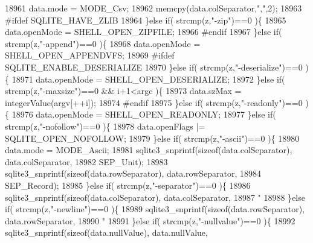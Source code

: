 \begin{DoxyCode}
{{{{18961       data.mode = MODE_Csv;
18962       memcpy(data.colSeparator,\textcolor{stringliteral}{","},2);
18963 \textcolor{preprocessor}{#ifdef SQLITE\_HAVE\_ZLIB}
18964     \}\textcolor{keywordflow}{else} \textcolor{keywordflow}{if}( strcmp(z,\textcolor{stringliteral}{"-zip"})==0 )\{
18965       data.openMode = SHELL_OPEN_ZIPFILE;
18966 \textcolor{preprocessor}{#endif}
18967     \}\textcolor{keywordflow}{else} \textcolor{keywordflow}{if}( strcmp(z,\textcolor{stringliteral}{"-append"})==0 )\{
18968       data.openMode = SHELL_OPEN_APPENDVFS;
18969 \textcolor{preprocessor}{#ifdef SQLITE\_ENABLE\_DESERIALIZE}
18970     \}\textcolor{keywordflow}{else} \textcolor{keywordflow}{if}( strcmp(z,\textcolor{stringliteral}{"-deserialize"})==0 )\{
18971       data.openMode = SHELL_OPEN_DESERIALIZE;
18972     \}\textcolor{keywordflow}{else} \textcolor{keywordflow}{if}( strcmp(z,\textcolor{stringliteral}{"-maxsize"})==0 && i+1<argc )\{
18973       data.szMax = integerValue(argv[++i]);
18974 \textcolor{preprocessor}{#endif}
18975     \}\textcolor{keywordflow}{else} \textcolor{keywordflow}{if}( strcmp(z,\textcolor{stringliteral}{"-readonly"})==0 )\{
18976       data.openMode = SHELL_OPEN_READONLY;
18977     \}\textcolor{keywordflow}{else} \textcolor{keywordflow}{if}( strcmp(z,\textcolor{stringliteral}{"-nofollow"})==0 )\{
18978       data.openFlags |= SQLITE_OPEN_NOFOLLOW;
18979     \}\textcolor{keywordflow}{else} \textcolor{keywordflow}{if}( strcmp(z,\textcolor{stringliteral}{"-ascii"})==0 )\{
18980       data.mode = MODE_Ascii;
18981       sqlite3_snprintf(\textcolor{keyword}{sizeof}(data.colSeparator), data.colSeparator,
18982                        SEP_Unit);
18983       sqlite3_snprintf(\textcolor{keyword}{sizeof}(data.rowSeparator), data.rowSeparator,
18984                        SEP_Record);
18985     \}\textcolor{keywordflow}{else} \textcolor{keywordflow}{if}( strcmp(z,\textcolor{stringliteral}{"-separator"})==0 )\{
18986       sqlite3_snprintf(\textcolor{keyword}{sizeof}(data.colSeparator), data.colSeparator,
18987                        \textcolor{stringliteral}{"%
18988     \}\textcolor{keywordflow}{else} \textcolor{keywordflow}{if}( strcmp(z,\textcolor{stringliteral}{"-newline"})==0 )\{
18989       sqlite3_snprintf(\textcolor{keyword}{sizeof}(data.rowSeparator), data.rowSeparator,
18990                        \textcolor{stringliteral}{"%
18991     \}\textcolor{keywordflow}{else} \textcolor{keywordflow}{if}( strcmp(z,\textcolor{stringliteral}{"-nullvalue"})==0 )\{
18992       sqlite3_snprintf(\textcolor{keyword}{sizeof}(data.nullValue), data.nullValue,
}}}}}}
\end{DoxyCode}
